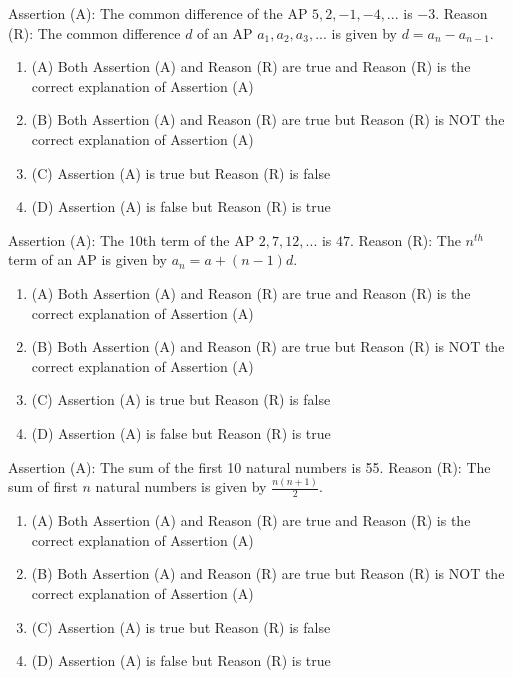 \documentclass[12pt,a4paper]{exam}
\begin{document}
\begin{questions}
\question[1] Assertion (A): The common difference of the AP $5, 2, -1, -4, ...$ is $-3$. Reason (R): The common difference $d$ of an AP $a_1, a_2, a_3, ...$ is given by $d = a_n - a_{n-1}$.
\begin{enumerate}[label=(\Alph*)]
  \item (A) Both Assertion (A) and Reason (R) are true and Reason (R) is the correct explanation of Assertion (A)
  \item (B) Both Assertion (A) and Reason (R) are true but Reason (R) is NOT the correct explanation of Assertion (A)
  \item (C) Assertion (A) is true but Reason (R) is false
  \item (D) Assertion (A) is false but Reason (R) is true
\end{enumerate}
\vspace{0.15cm}

\question[1] Assertion (A): The 10th term of the AP $2, 7, 12, ...$ is $47$. Reason (R): The $n^{th}$ term of an AP is given by $a_n = a + (n-1)d$.
\begin{enumerate}[label=(\Alph*)]
  \item (A) Both Assertion (A) and Reason (R) are true and Reason (R) is the correct explanation of Assertion (A)
  \item (B) Both Assertion (A) and Reason (R) are true but Reason (R) is NOT the correct explanation of Assertion (A)
  \item (C) Assertion (A) is true but Reason (R) is false
  \item (D) Assertion (A) is false but Reason (R) is true
\end{enumerate}
\vspace{0.15cm}

\question[1] Assertion (A): The sum of the first 10 natural numbers is 55. Reason (R): The sum of first $n$ natural numbers is given by $\frac{n(n+1)}{2}$.
\begin{enumerate}[label=(\Alph*)]
  \item (A) Both Assertion (A) and Reason (R) are true and Reason (R) is the correct explanation of Assertion (A)
  \item (B) Both Assertion (A) and Reason (R) are true but Reason (R) is NOT the correct explanation of Assertion (A)
  \item (C) Assertion (A) is true but Reason (R) is false
  \item (D) Assertion (A) is false but Reason (R) is true
\end{enumerate}
\vspace{0.15cm}


\end{questions}
\end{document}
